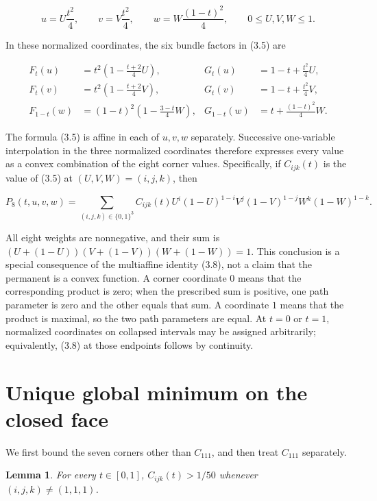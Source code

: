 \documentclass[11pt]{article}
\newtheorem{lemma}[theorem]{Lemma}
\theoremstyle{definition}
\begin{document}
\[
u=U\frac{t^2}{4},\qquad v=V\frac{t^2}{4},\qquad
w=W\frac{(1-t)^2}{4},\qquad 0\le U,V,W\le1.             \tag{3.7}
\]

In these normalized coordinates, the six bundle factors in (3.5) are

\[
\begin{aligned}
F_t(u)&=t^2\left(1-\frac{t+2}{4}U\right),
&G_t(u)&=1-t+\frac{t^2}{4}U,\\
F_t(v)&=t^2\left(1-\frac{t+2}{4}V\right),
&G_t(v)&=1-t+\frac{t^2}{4}V,\\
F_{1-t}(w)&=(1-t)^2\left(1-\frac{3-t}{4}W\right),
&G_{1-t}(w)&=t+\frac{(1-t)^2}{4}W.
\end{aligned}
\]

The formula (3.5) is affine in each of \(u,v,w\) separately. Successive
one-variable interpolation in the three normalized coordinates therefore
expresses every value as a convex combination of the eight corner values.
Specifically, if \(C_{ijk}(t)\) is the value of (3.5) at
\((U,V,W)=(i,j,k)\), then

\[
P_8(t,u,v,w)=\sum_{(i,j,k)\in\{0,1\}^3}
C_{ijk}(t)
U^i(1-U)^{1-i}V^j(1-V)^{1-j}W^k(1-W)^{1-k}.             \tag{3.8}
\]

All eight weights are nonnegative, and their sum is
\((U+(1-U))(V+(1-V))(W+(1-W))=1\). This conclusion is a
special consequence of the multiaffine identity (3.8), not a claim that the
permanent is a convex function. A corner coordinate \(0\) means that the
corresponding product is zero; when the prescribed sum is positive, one path
parameter is zero and the other equals that sum. A coordinate \(1\) means
that the product is maximal, so the two path parameters are equal. At \(t=0\)
or \(t=1\), normalized coordinates on collapsed intervals may be assigned
arbitrarily; equivalently, (3.8) at those endpoints follows by continuity.

\section{Unique global minimum on the closed face}

We first bound the seven corners other than \(C_{111}\), and then treat
\(C_{111}\) separately.

\begin{lemma}
For every \(t\in[0,1]\), \(C_{ijk}(t)>1/50\) whenever
\((i,j,k)\ne(1,1,1)\).
\end{lemma}
\end{document}
